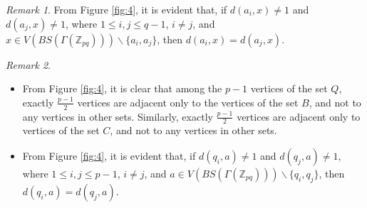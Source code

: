 \documentclass[]{interact}
\theoremstyle{plain}%
\theoremstyle{definition}
\theoremstyle{remark}
\newtheorem{remark}{Remark}[section]
\begin{document}
\begin{remark}\label{22}
  From Figure \ref{fig:4}, it is evident that, if $d(a_i,x)\neq 1$ and $d(a_j,x) \neq 1$, where $1\leq i, j \leq q-1$, $i\neq j$, and $x\in V(BS(\Gamma(\mathbb{Z}_{pq})))\backslash\{a_i,a_j\}$, then $d(a_i,x)=d(a_j,x)$.     
 \end{remark}
 \begin{remark} \label{last} \quad \\
    \begin{itemize}
        \item From Figure \ref{fig:4}, it is clear that among the \( p-1 \) vertices of the set \( Q \), exactly \( \frac{p-1}{2} \) vertices are adjacent only to the vertices of the set \( B \), and not to any vertices in other sets. Similarly, exactly \( \frac{p-1}{2} \) vertices are adjacent only to vertices of the set \( C \), and not to any vertices in other sets.
    \item From Figure \ref{fig:4}, it is evident that, if $d(q_i,a)\neq 1$ and $d(q_j,a) \neq 1$, where $1\leq i, j \leq p-1$, $i\neq j$, and $a\in V(BS(\Gamma(\mathbb{Z}_{pq})))\backslash\{q_i,q_j\}$, then $d(q_i,a)=d(q_j,a)$.\\     
\end{itemize}
\end{remark}
\end{document}
